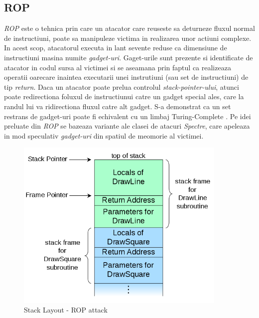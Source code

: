 \subsection{ROP}\label{sec:rop}

\emph{ROP} \cite{shacham2007geometry} este o tehnica prin care un atacator care
reuseste sa deturneze fluxul normal de instructiuni, poate sa manipuleze
victima in realizarea unor actiuni complexe. In acest scop, atacatorul executa
in lant sevente reduse ca dimensiune de instructiuni masina numite
\emph{gadget-uri}. Gaget-urile sunt prezente si identificate de atacator in
codul sursa al victimei si se aseamana prin faptul ca realizeaza operatii
oarecare inaintea executarii unei instrutiuni (sau set de instructiuni) de tip
\emph{return}. Daca un atacator poate prelua controlul
\emph{stack-pointer-ului}, atunci poate redirectiona foluxul de instructiunui
catre un gadget special ales, care la randul lui va ridirectiona fluxul catre
alt gadget. S-a demonstrat ca un set restrans de gadget-uri poate fi echivalent
cu un limbaj Turing-Complete \cite{homescu2012microgadgets}. Pe idei preluate
din \emph{ROP} se bazeaza variante ale clasei de atacuri \emph{Spectre}, care
apeleaza in mod speculativ \emph{gadget-uri} din spatiul de meomorie al
victimei.

\begin{figure}[ht]
	\centering
	\includegraphics[width=0.9\textwidth]{images/rop_stack_layout.png}
  \caption{Stack Layout - ROP attack \cite{rop_figure}}
  \label{fig:rop_stack_layout}
\end{figure}

